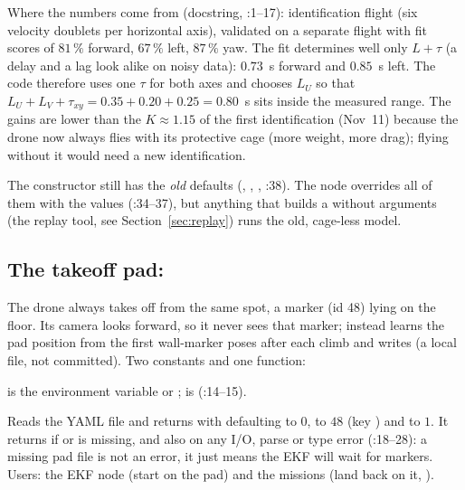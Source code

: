 Where the numbers come from (docstring, :1--17): identification flight 
(six velocity doublets per horizontal axis), validated on a separate flight with fit scores of $81\,\%$ forward, $67\,\%$ left,
$87\,\%$ yaw. The fit determines well only $L+\tau$ (a delay and a lag look alike on noisy data): $0.73$~s forward and
$0.85$~s left. The code therefore uses one $\tau$ for both axes and chooses $L_U$ so that
$L_U + L_V + \tau_{xy} = 0.35+0.20+0.25 = 0.80$~s sits inside the measured range. The gains are lower than the
$K\approx1.15$ of the first identification (Nov~11) because the drone now always flies with its protective cage (more
weight, more drag); flying without it would need a new identification.

\begin{keypoint}
The  constructor still has the \emph{old} defaults (, ,
, :38). The node overrides all of them with the  values
(:34--37), but anything that builds a  without arguments (the replay tool, see
Section~\ref{sec:replay}) runs the old, cage-less model.
\end{keypoint}

\subsection[The takeoff pad: home.py]{The takeoff pad: }

The drone always takes off from the same spot, a marker (id 48) lying on the floor. Its camera looks forward, so it never
sees that marker; instead  learns the pad position from the first wall-marker poses after each
climb and writes  (a local file, not committed). Two constants and one function:

 is the environment variable  or ;
 is  (:14--15).

Reads the YAML file and returns  with  defaulting to $0$,
 to $48$ (key ) and  to $1$. It returns  if  or 
is missing, and also on any I/O, parse or type error (:18--28): a missing pad file is not an error, it
just means the EKF will wait for markers. Users: the EKF node (start on the pad) and the missions (land back on it,
).

